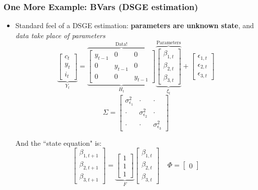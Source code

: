 \documentclass{beamer}
\begin{document}
\begin{frame}
\frametitle[alignment=center]{One More Example: BVars (DSGE estimation)} 
\begin{itemize}
\item Standard feel of a DSGE estimation:  \textbf{parameters are unknown state}, and \emph{data take place of parameters}
$$\underbrace{\left[\begin{array}{c} c_{t} \\   y_{t} \\ i_t \end{array}\right]}_{Y_t}=\overbrace{\underbrace{\left[\begin{array}{cccccc}   y_{t-1} & 0 & 0 \\ 0 & y_{t-1} & 0 \\ 0 & 0 & y_{t-1}\end{array}\right]}_{H_t}}^{\text{Data!}}\overbrace{\underbrace{\left[\begin{array}{c}   \beta_{1,t } \\ \beta_{2,t } \\ \beta_{3,t }  \end{array}\right]}_{\xi_t}}^{\text{Parameters}}+\left[\begin{array}{c}\epsilon_{1,t} \\ \epsilon_{2,t} \\ \epsilon_{3,t} \end{array}\right]$$
$$\Sigma=\left[\begin{array}{ccc}\sigma^2_{\epsilon_1} & \cdot & \cdot \\ \cdot & \sigma^2_{\epsilon_2} & \cdot \\ \cdot & \cdot & \sigma^2_{\epsilon_3} \end{array}\right]$$

And the ``state equation" is:
$$\left[\begin{array}{c}   \beta_{1,t+1 } \\ \beta_{2,t +1} \\ \beta_{3,t+1 }  \end{array}\right]=\underbrace{\left[\begin{array}{cccc} 1 \\ 1 \\ 1 \end{array}\right]}_{F}\left[\begin{array}{c}   \beta_{1,t } \\ \beta_{2,t } \\ \beta_{3,t}  \end{array}\right]\ \ \ \ \ \Phi = \left[\begin{array}{c}0\end{array}\right]$$
\end{itemize}
\end{frame}
\end{document}
